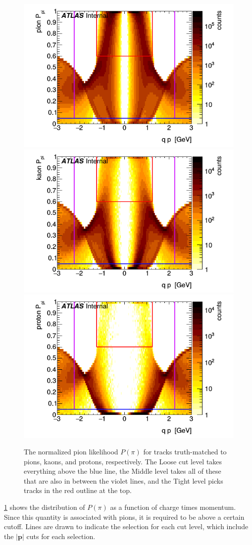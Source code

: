 \begin{figure}[t]
\begin{minipage}[t]{1.0\textwidth}
\centering
\includegraphics[width=.32\linewidth]{P_pion_pi.png}
\includegraphics[width=.32\linewidth]{P_kaon_pi.png}
\includegraphics[width=.32\linewidth]{P_proton_pi.png}
\end{minipage}
\caption{The normalized pion likelihood $P(\pi)$ for tracks truth-matched to pions, kaons, and protons, respectively. The Loose cut level takes everything above the blue line, the Middle level takes all of these that are also in between the violet lines, and the Tight level picks tracks in the red outline at the top.}
\label{fig:prob_pi}
\end{figure}

\cref{fig:prob_pi} shows the distribution of $P(\pi)$ as a function of charge times momentum.
Since this quantity is associated with pions, it is required to be above a certain cutoff.
Lines are drawn to indicate the selection for each cut level, which include the $\left|\mathbf{p}\right|$ cuts for each selection.

